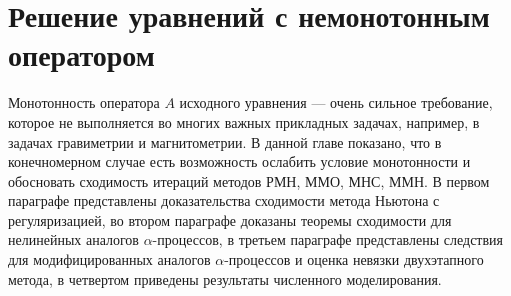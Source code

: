 \chapter{Решение уравнений с немонотонным оператором}
Монотонность оператора $A$ исходного уравнения --- очень сильное требование, которое не выполняется во многих важных прикладных задачах, например, в задачах гравиметрии и магнитометрии. В данной главе показано, что в конечномерном случае есть возможность ослабить условие монотонности и обосновать сходимость итераций методов РМН, ММО, МНС, ММН.
В первом параграфе представлены доказательства сходимости метода Ньютона с регуляризацией, во втором параграфе доказаны теоремы сходимости для нелинейных аналогов $\alpha$-процессов, в третьем параграфе представлены следствия для модифицированных аналогов $\alpha$-процессов и оценка невязки двухэтапного метода, в четвертом приведены результаты численного моделирования.

\newpage
